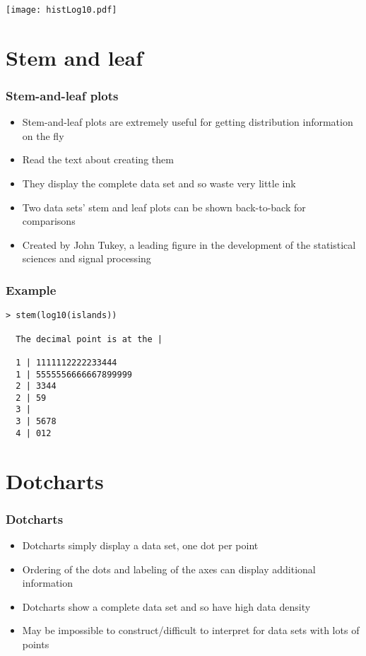 \documentclass[aspectratio=169]{beamer}
\begin{document}
\begin{frame}
\texttt{[image: histLog10.pdf]}
\end{frame}

\section{Stem and leaf}
\begin{frame}\frametitle{Stem-and-leaf plots}
\begin{itemize}
\item Stem-and-leaf plots are extremely useful for getting
  distribution information on the fly
\item Read the text about creating them
\item They display the complete data set and so waste very little ink
\item Two data sets' stem and leaf plots can be shown back-to-back for
  comparisons
\item Created by John Tukey, a leading figure in the development of
  the statistical sciences and signal processing
\end{itemize}
\end{frame}

\begin{frame}[fragile]\frametitle{Example}
\begin{verbatim}
> stem(log10(islands))

  The decimal point is at the |

  1 | 1111112222233444
  1 | 5555556666667899999
  2 | 3344
  2 | 59
  3 | 
  3 | 5678
  4 | 012
\end{verbatim}
\end{frame}

\section{Dotcharts}
\begin{frame}\frametitle{Dotcharts}
\begin{itemize}
\item Dotcharts simply display a data set, one dot per point
\item Ordering of the dots and labeling of the axes
  can display additional information
\item Dotcharts show a complete data set and so have high
  data density
\item May be impossible to construct/difficult to interpret
  for data sets with lots of points
\end{itemize}
\end{frame}
\end{document}
